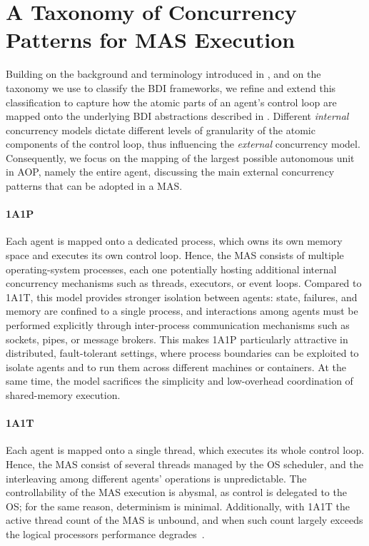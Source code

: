 \section{A Taxonomy of Concurrency Patterns for \ac{MAS} Execution}
\label{sec:taxonomy}

Building on the background and terminology introduced in , 
and on the taxonomy we use to classify the \ac{BDI} frameworks,
we refine and extend this classification 
to capture how the atomic parts of an agent's control loop 
are mapped onto the underlying \ac{BDI} abstractions described in .
%
Different \emph{internal} concurrency models dictate different levels of granularity of the atomic components of the control loop,
thus influencing the \emph{external} concurrency model.
%
Consequently,
we focus on the mapping of the largest possible autonomous unit in \ac{AOP}, namely the entire agent,
discussing the main external concurrency patterns that can be adopted in a \ac{MAS}.

\paragraph{\ac{1A1P}}

Each agent is mapped onto a dedicated process, 
which owns its own memory space and executes its own control loop.
%
Hence, 
the \ac{MAS} consists of multiple operating-system processes, 
each one potentially hosting additional internal concurrency mechanisms 
such as threads, executors, or event loops.
%
Compared to \ac{1A1T}, 
this model provides stronger isolation between agents:
state, failures, and memory are confined to a single process, 
and interactions among agents must be performed explicitly 
through inter-process communication mechanisms 
such as sockets, pipes, or message brokers.
%
This makes \ac{1A1P} particularly attractive in distributed, fault-tolerant settings,
where process boundaries can be exploited to isolate agents 
and to run them across different machines or containers.
%
At the same time, 
the model sacrifices the simplicity and low-overhead coordination of shared-memory execution.

\paragraph{\ac{1A1T}}

Each agent is mapped onto a single thread, which executes its whole control loop.
%
Hence, the \ac{MAS} consist of several threads managed by the \ac{OS} scheduler,
and the interleaving among different agents' operations is unpredictable.
%
The controllability of the \ac{MAS} execution is abysmal, as control is delegated to the \ac{OS};
for the same reason, determinism is minimal.
%
Additionally, with \ac{1A1T} the active thread count of the \ac{MAS} is unbound,
and when such count largely exceeds the logical processors performance degrades~\cite{DBLP:journals/sigops/LingML00}.

